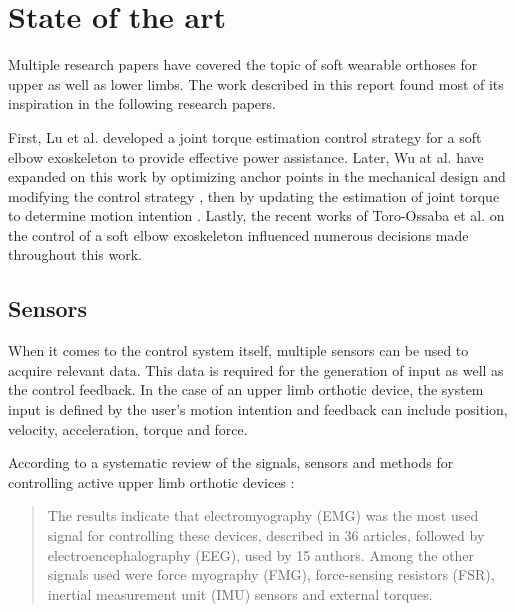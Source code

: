 \chapter{State of the art}
Multiple research papers have covered the topic of soft wearable orthoses for 
upper as well as lower limbs. The work described in this report found most of its 
inspiration in the following research papers. 

First, Lu et al. \cite{lu_development_2019} developed 
a joint torque estimation control strategy for a soft elbow exoskeleton to 
provide effective power assistance. Later, Wu at al. 
have expanded on this work by optimizing anchor points in the mechanical design and 
modifying the control strategy \cite{wu_neural-network-enhanced_2019}, then by updating 
the estimation of joint torque to determine motion intention \cite{wu_adaptive_2023}.
Lastly, the recent works of Toro-Ossaba et al. \cite{toro-ossaba_myoelectric_2024} 
on the control of a soft elbow exoskeleton influenced numerous decisions made 
throughout this work.  


\section{Sensors}
When it comes to the control system itself, multiple sensors can be used to acquire 
relevant data. This data is required for the generation of input as well as the 
control feedback. In the case of an upper limb orthotic device, the system input 
is defined by the user's motion intention and feedback can include position, velocity, 
acceleration, torque and force.

According to a systematic review of the signals, sensors and methods for controlling 
active upper limb orthotic devices \cite{dos_santos_signals_2023}:
\begin{quotation}
The results indicate that electromyography (EMG) was the most used signal for 
controlling these devices, described in 36 articles, followed by 
electroencephalography (EEG), used by 15 authors. Among the other signals used 
were force myography (FMG), force-sensing resistors (FSR), inertial measurement 
unit (IMU) sensors and external torques.
\end{quotation}

